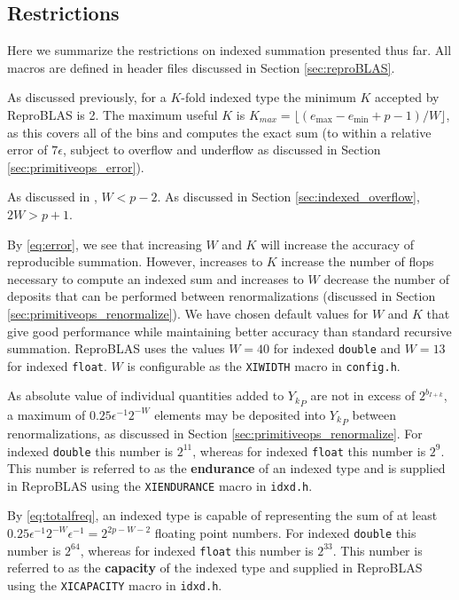 \subsection{Restrictions}
    \label{sec:primitiveops_restrictions}
    Here we summarize the restrictions on indexed summation presented thus far. All macros are defined in header files discussed in Section \ref{sec:reproBLAS}.

    As discussed previously, for a $K$-fold indexed type the minimum $K$
    accepted by ReproBLAS is 2. The maximum useful $K$ is
    $K_{max}=\lfloor(e_{\max} - e_{\min} + p - 1)/W\rfloor$,
    as this covers all of the bins and computes the exact sum (to within a relative error of $7 \epsilon$, subject to overflow and underflow as discussed in Section \ref{sec:primitiveops_error}).

    As discussed in \cite{repsum}, $W < p - 2$. As discussed in Section
    \ref{sec:indexed_overflow}, $2 W > p + 1$.

    By \eqref{eq:error}, we see that increasing $W$ and $K$ will increase
    the accuracy of reproducible summation. However, increases to $K$ increase the number of flops necessary to compute an indexed sum and increases to $W$ decrease the number of deposits that can be performed between renormalizations (discussed in Section \ref{sec:primitiveops_renormalize}).
    We have chosen default values for $W$ and $K$ that give good performance while maintaining better accuracy than standard recursive summation.
    ReproBLAS uses the values $W = 40$ for indexed \texttt{double} and $W = 13$
    for indexed \texttt{float}. $W$ is configurable as the \texttt{XIWIDTH} macro in \texttt{config.h}.

    As absolute value of individual quantities added to ${Y_k}_P$ are not in
    excess of $2^{b_{I + k}}$, a maximum of $0.25\epsilon^{-1}2^{-W}$ elements
    may be deposited into ${Y_k}_P$ between renormalizations, as discussed in
    Section \ref{sec:primitiveops_renormalize}. For indexed \texttt{double}
    this number is $2^{11}$, whereas for indexed \texttt{float} this number is
    $2^9$. This number is referred to as the \textbf{endurance} of an indexed type and is supplied in ReproBLAS using the
    \texttt{XIENDURANCE} macro in \texttt{idxd.h}.

    By \eqref{eq:totalfreq}, an indexed type is capable of representing the sum
    of at least $0.25\epsilon^{-1}2^{-W}  \epsilon^{-1} = 2^{2  p - W - 2}$
    floating point numbers. For indexed \texttt{double} this number is
    $2^{64}$, whereas for indexed \texttt{float} this number is
    $2^{33}$. This number is referred to as the \textbf{capacity} of the indexed type and supplied in ReproBLAS using the
    \texttt{XICAPACITY} macro in \texttt{idxd.h}.

